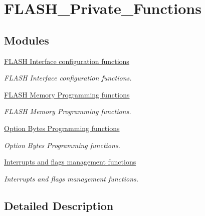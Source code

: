 \hypertarget{group___f_l_a_s_h___private___functions}{}\section{F\+L\+A\+S\+H\+\_\+\+Private\+\_\+\+Functions}
\label{group___f_l_a_s_h___private___functions}
\subsection*{Modules}
\begin{DoxyCompactItemize}
\item 
\hyperlink{group___f_l_a_s_h___group1}{F\+L\+A\+S\+H Interface configuration functions}
\begin{DoxyCompactList}\small\item\em F\+L\+A\+S\+H Interface configuration functions. \end{DoxyCompactList}\item 
\hyperlink{group___f_l_a_s_h___group2}{F\+L\+A\+S\+H Memory Programming functions}
\begin{DoxyCompactList}\small\item\em F\+L\+A\+S\+H Memory Programming functions. \end{DoxyCompactList}\item 
\hyperlink{group___f_l_a_s_h___group3}{Option Bytes Programming functions}
\begin{DoxyCompactList}\small\item\em Option Bytes Programming functions. \end{DoxyCompactList}\item 
\hyperlink{group___f_l_a_s_h___group4}{Interrupts and flags management functions}
\begin{DoxyCompactList}\small\item\em Interrupts and flags management functions. \end{DoxyCompactList}\end{DoxyCompactItemize}


\subsection{Detailed Description}
